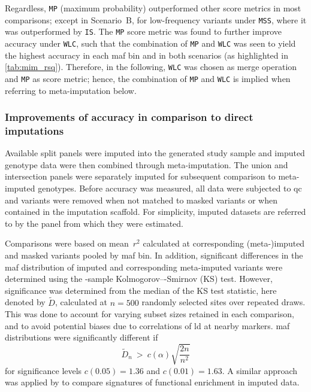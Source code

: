 Regardless, \texttt{MP} (maximum probability) outperformed other score metrics in most comparisons; except in Scenario~B, for low-frequency variants under \texttt{MSS}, where it was outperformed by \texttt{IS}.
The \texttt{MP} score metric was found to further improve accuracy under \texttt{WLC}, such that the combination of \texttt{MP} and \texttt{WLC} was seen to yield the highest accuracy in each \gls{maf} bin and in both scenarios (as highlighted in \cref{tab:mim_rsq}).
Therefore, in the following, \texttt{WLC} was chosen as merge operation and \texttt{MP} as score metric; hence, the combination of \texttt{MP} and \texttt{WLC} is implied when referring to meta-imputation below.


%
\subsubsection{Improvements of accuracy in comparison to direct imputations}
%

Available split panels were imputed into the generated study sample and imputed genotype data were then combined through meta-imputation.
The union and intersection panels were separately imputed for subsequent comparison to meta-imputed genotypes.
Before accuracy was measured, all data were subjected to \gls{qc} and variants were removed when not matched to masked variants or when contained in the imputation scaffold.
For simplicity, imputed datasets are referred to by the panel from which they were estimated.

Comparisons were based on mean~$r^2$ calculated at corresponding (meta-)imputed and masked variants pooled by \gls{maf} bin.
In addition, significant differences in the \gls{maf} distribution of imputed and corresponding meta-imputed variants were determined using the -sample Kolmogorov–-Smirnov (KS) test.
However, significance was determined from the median of the KS test statistic, here denoted by $\widetilde{D}$, calculated at ${n = \num{500}}$ randomly selected sites over  repeated draws.
This was done to account for varying subset sizes retained in each comparison, and to avoid potential biases due to correlations of \gls{ld} at nearby markers.
\Gls{maf} distributions were significantly different if
\begin{equation}\label{eq:meta_ks_test}
	\widetilde{D}_{n} ~ > ~ c(\alpha) \sqrt{\frac{2n}{n^2}}
\end{equation}
for significance levels ${c(0.05)=1.36}$ and ${c(0.01)=1.63}$.
A similar approach was applied by \citet{Pasaniuc:2014hq} to compare signatures of functional enrichment in imputed data.



